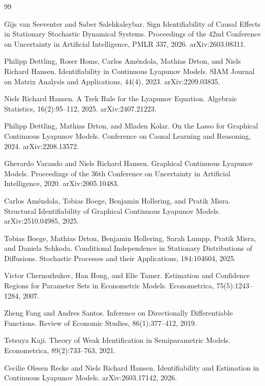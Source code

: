 \documentclass{article}
\begin{document}
\begin{thebibliography}{99}

   Gijs van Seeventer and Saber Salehkaleybar. Sign Identifiability of Causal Effects in Stationary Stochastic Dynamical Systems. Proceedings of the 42nd Conference on Uncertainty in Artificial Intelligence, PMLR 337, 2026. arXiv:2603.08311.

   Philipp Dettling, Roser Homs, Carlos Améndola, Mathias Drton, and Niels Richard Hansen. Identifiability in Continuous Lyapunov Models. SIAM Journal on Matrix Analysis and Applications, 44(4), 2023. arXiv:2209.03835.

   Niels Richard Hansen. A Trek Rule for the Lyapunov Equation. Algebraic Statistics, 16(2):95--112, 2025. arXiv:2407.21223.

   Philipp Dettling, Mathias Drton, and Mladen Kolar. On the Lasso for Graphical Continuous Lyapunov Models. Conference on Causal Learning and Reasoning, 2024. arXiv:2208.13572.

   Gherardo Varando and Niels Richard Hansen. Graphical Continuous Lyapunov Models. Proceedings of the 36th Conference on Uncertainty in Artificial Intelligence, 2020. arXiv:2005.10483.

   Carlos Améndola, Tobias Boege, Benjamin Hollering, and Pratik Misra. Structural Identifiability of Graphical Continuous Lyapunov Models. arXiv:2510.04985, 2025.

   Tobias Boege, Mathias Drton, Benjamin Hollering, Sarah Lumpp, Pratik Misra, and Daniela Schkoda. Conditional Independence in Stationary Distributions of Diffusions. Stochastic Processes and their Applications, 184:104604, 2025.

   Victor Chernozhukov, Han Hong, and Elie Tamer. Estimation and Confidence Regions for Parameter Sets in Econometric Models. Econometrica, 75(5):1243--1284, 2007.

   Zheng Fang and Andres Santos. Inference on Directionally Differentiable Functions. Review of Economic Studies, 86(1):377--412, 2019.

   Tetsuya Kaji. Theory of Weak Identification in Semiparametric Models. Econometrica, 89(2):733--763, 2021.

   Cecilie Olesen Recke and Niels Richard Hansen. Identifiability and Estimation in Continuous Lyapunov Models. arXiv:2603.17142, 2026.

\end{thebibliography}
\end{document}

